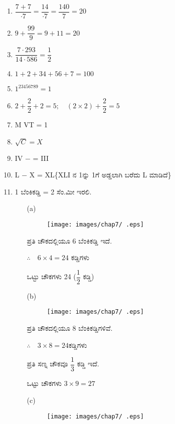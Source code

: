 \begin{enumerate}
\item $\dfrac{7+7}{\cdot 7} = \dfrac{14}{\cdot 7} = \dfrac{140}{7} = 20$

\item $9 + \dfrac{99}{9} = 9 + 11 = 20$

\item $\dfrac{7\cdot 293}{14\cdot 586} = \dfrac{1}{2}$

\item $1+2+34+56+7 = 100$

\item $1^{23456789} = 1$

\item $2 + \dfrac{2}{2} + 2 = 5;\quad (2 \times 2)  + \dfrac{2}{2} = 5$

\item M \qquad VT = 1

\item $\sqrt{C} = X$

\item IV $-$ = III

\item L $-$ X = XL\quad \{XLI ನ 1ನ್ನು 1ಗೆ ಅಡ್ಡಲಾಗಿ ಬರೆದು L ಮಾಡಿದೆ\}

\item 1 ಬೆಂಕಿಕಡ್ಡಿ = 2 ಸೆಂ.ಮೀ ಇರಲಿ. 

\begin{itemize}
\item[(a)] 
\begin{figure}[!h]
\centering
\texttt{[image: images/chap7/ .eps]}
\end{figure}

ಪ್ರತಿ ಚೌಕದಲ್ಲಿಯೂ 6 ಬೆಂಕಿಕಡ್ಡಿ ಇದೆ. 

$\therefore\quad 6\times 4 = 24$ ಕಡ್ಡಿಗಳು 

ಒಟ್ಟು ಚೌಕಗಳು 24 ($\dfrac{1}{2}$ ಕಡ್ಡಿ)
\item[(b)]
\begin{figure}[!h]
\centering
\texttt{[image: images/chap7/ .eps]}
\end{figure}

ಪ್ರತಿ ಚೌಕದಲ್ಲಿಯೂ 8 ಬೆಂಕಿಕಡ್ಡಿಗಳಿವೆ. 

$\therefore\quad 3 \times 8 = 24$ಕಡ್ಡಿಗಳು 

ಪ್ರತಿ ಸಣ್ನ ಚೌಕವೂ $\dfrac{1}{3}$ ಕಡ್ಡಿ ಇದೆ. 

ಒಟ್ಟು ಚೌಕಗಳು $3 \times 9 = 27$
\item[(c)] 
\begin{figure}[!h]
\centering
\texttt{[image: images/chap7/ .eps]}
\end{figure}


\end{itemize}
\end{enumerate}

